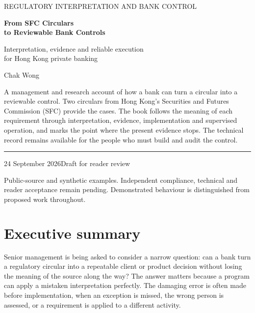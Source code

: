\documentclass[12pt,a4paper,oneside,openany]{book}
\begin{document}
\raggedbottom
\frontmatter
\hypersetup{pageanchor=false}
\begin{titlepage}
\vspace*{15mm}
{\sffamily\color{teal}\large REGULATORY INTERPRETATION AND BANK CONTROL\par}
\vspace{12mm}
{\sffamily\bfseries\color{navy}\fontsize{32}{37}\selectfont From SFC Circulars\\to Reviewable Bank Controls\par}
\vspace{12mm}
{\Large Interpretation, evidence and reliable execution\\for Hong Kong private banking\par}
\vspace{12mm}
{\large Chak Wong\par}
\vfill
\begin{minipage}{0.94\textwidth}
A management and research account of how a bank can turn a circular into a
reviewable control. Two circulars from Hong Kong's Securities and Futures
Commission (SFC) provide the cases. The book follows the
meaning of each requirement through interpretation, evidence, implementation
and supervised operation, and marks the point where the present evidence stops.
The technical record remains available for the people who must build and audit
the control.
\end{minipage}
\vspace{16mm}
\hrule
\vspace{5mm}
24 September 2026\hfill Draft for reader review\par
\small Public-source and synthetic examples. Independent compliance, technical
and reader acceptance remain pending. Demonstrated behaviour is distinguished
from proposed work throughout.
\end{titlepage}
\hypersetup{pageanchor=true}
\chapter*{Executive summary}
Senior management is being asked to consider a narrow question: can a bank turn
a regulatory circular into a repeatable client or product decision without
losing the meaning of the source along the way? The answer matters because a
program can apply a mistaken interpretation perfectly. The damaging error is
often made before implementation, when an exception is missed, the wrong person
is assessed, or a requirement is applied to a different activity.
\end{document}
